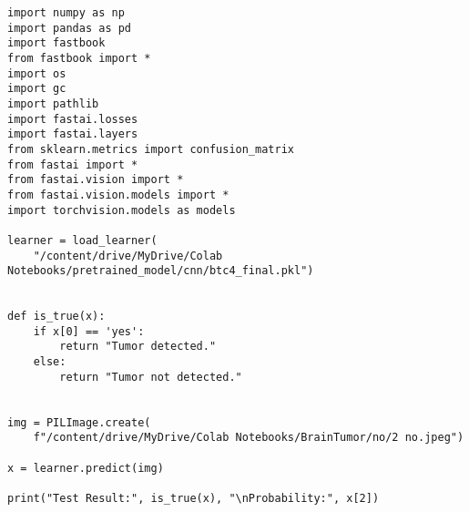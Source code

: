 \begin{verbatim}
import numpy as np
import pandas as pd
import fastbook
from fastbook import *
import os
import gc
import pathlib
import fastai.losses
import fastai.layers
from sklearn.metrics import confusion_matrix
from fastai import *
from fastai.vision import *
from fastai.vision.models import *
import torchvision.models as models

learner = load_learner(
    "/content/drive/MyDrive/Colab Notebooks/pretrained_model/cnn/btc4_final.pkl")


def is_true(x):
    if x[0] == 'yes':
        return "Tumor detected."
    else:
        return "Tumor not detected."


img = PILImage.create(
    f"/content/drive/MyDrive/Colab Notebooks/BrainTumor/no/2 no.jpeg")

x = learner.predict(img)

print("Test Result:", is_true(x), "\nProbability:", x[2])
\end{verbatim}
